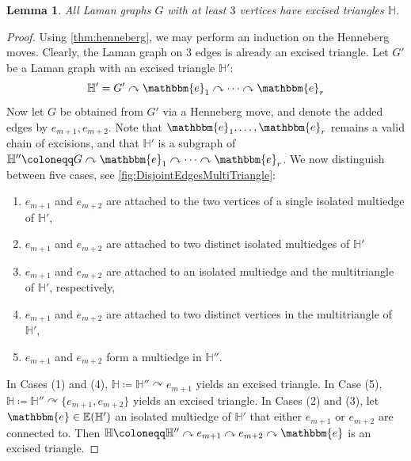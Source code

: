 \documentclass[11pt,reqno,a4paper]{amsart}
\theoremstyle{theoremstyle}
\newtheorem{lemma}[theorem]{Lemma}
\theoremstyle{examplestyle}
\theoremstyle{algorithmstyle}
\newcommand{\EE}{\mathbb{E}}
\newcommand{\ee}{\mathbbm{e}}
\newcommand{\HH}{\mathbb{H}}
\begin{document}
\begin{lemma}
  \label{lem:excisedTriangles}
  All Laman graphs $G$ with at least $3$ vertices have excised triangles $\HH$.
\end{lemma}

\begin{proof}
  Using \cref{thm:henneberg}, we may perform an induction on the Henneberg moves.
  Clearly, the Laman graph on $3$ edges is already an excised triangle. Let $G'$ be a Laman graph with an excised triangle $\HH'$:
  \begin{equation*}
    \HH'=G'\curvearrowright\ee_1\curvearrowright\dots\curvearrowright\ee_r
  \end{equation*}
  Now let $G$ be obtained from $G'$ via a Henneberg move, and denote the added edges by $e_{m+1}, e_{m+2}$.  Note that $\ee_1,\dots,\ee_r$ remains a valid chain of excisions, and that $\HH'$ is a subgraph of $\HH''\coloneqq G\curvearrowright\ee_1\curvearrowright\dots\curvearrowright\ee_r$.  We now distinguish between five cases, see \cref{fig:DisjointEdgesMultiTriangle}:
  \begin{enumerate}
  \item $e_{m+1}$ and $e_{m+2}$ are attached to the two vertices of a single isolated multiedge of $\HH'$,
  \item $e_{m+1}$ and $e_{m+2}$ are attached to two distinct isolated multiedges of $\HH'$
  \item $e_{m+1}$ and $e_{m+2}$ are attached to an isolated multiedge and the multitriangle of $\HH'$, respectively,
  \item $e_{m+1}$ and $e_{m+2}$ are attached to two distinct vertices in the multitriangle of $\HH'$,
  \item $e_{m+1}$ and $e_{m+2}$ form a multiedge in $\HH''$.
  \end{enumerate}
  In Cases (1) and (4), $\HH\coloneqq\HH''\curvearrowright e_{m+1}$ yields an excised triangle.
  In Case (5), $\HH\coloneqq\HH''\curvearrowright \{e_{m+1},e_{m+2}\}$ yields an excised triangle.
  In Cases (2) and (3), let $\ee\in\EE(\HH')$ an isolated multiedge of $\HH'$ that either $e_{m+1}$ or $e_{m+2}$ are connected to.  Then $\HH\coloneqq\HH''\curvearrowright e_{m+1}\curvearrowright e_{m+2}\curvearrowright \ee$ is an excised triangle.
\end{proof}
\end{document}
